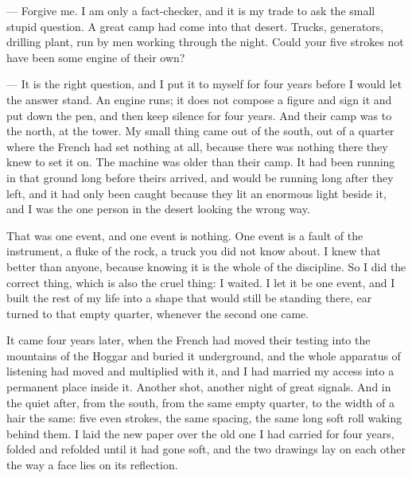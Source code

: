 \begin{room}

--- Forgive me. I am only a fact-checker, and it is my trade to ask the small stupid question. A great camp had come into that desert. Trucks, generators, drilling plant, run by men working through the night. Could your five strokes not have been some engine of their own?

--- It is the right question, and I put it to myself for four years before I would let the answer stand. An engine runs; it does not compose a figure and sign it and put down the pen, and then keep silence for four years. And their camp was to the north, at the tower. My small thing came out of the south, out of a quarter where the French had set nothing at all, because there was nothing there they knew to set it on. The machine was older than their camp. It had been running in that ground long before theirs arrived, and would be running long after they left, and it had only been caught because they lit an enormous light beside it, and I was the one person in the desert looking the wrong way.

\end{room}

\ornament

That was one event, and one event is nothing. One event is a fault of the instrument, a fluke of the rock, a truck you did not know about. I knew that better than anyone, because knowing it is the whole of the discipline. So I did the correct thing, which is also the cruel thing: I waited. I let it be one event, and I built the rest of my life into a shape that would still be standing there, ear turned to that empty quarter, whenever the second one came.\par

It came four years later, when the French had moved their testing into the mountains of the Hoggar and buried it underground, and the whole apparatus of listening had moved and multiplied with it, and I had married my access into a permanent place inside it. Another shot, another night of great signals. And in the quiet after, from the south, from the same empty quarter, to the width of a hair the same: five even strokes, the same spacing, the same long soft roll waking behind them. I laid the new paper over the old one I had carried for four years, folded and refolded until it had gone soft, and the two drawings lay on each other the way a face lies on its reflection.\par

